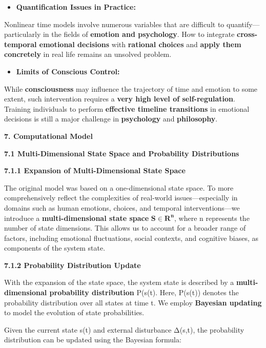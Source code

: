 \documentclass[
]{article}
\begin{document}
\begin{itemize}
\item
  \textbf{Quantification Issues in Practice:}
\end{itemize}

Nonlinear time models involve numerous variables that are difficult to
quantify---particularly in the fields of \textbf{emotion and
psychology}. How to integrate \textbf{cross-temporal emotional
decisions} with \textbf{rational choices} and \textbf{apply them
concretely} in real life remains an unsolved problem.

\begin{itemize}
\item
  \textbf{Limits of Conscious Control:}
\end{itemize}

While \textbf{consciousness} may influence the trajectory of time and
emotion to some extent, such intervention requires a \textbf{very high
level of self-regulation}. Training individuals to perform
\textbf{effective timeline transitions} in emotional decisions is still
a major challenge in \textbf{psychology} and \textbf{philosophy}.

\textbf{7. Computational Model}

\textbf{7.1 Multi-Dimensional State Space and Probability Distributions}

\textbf{7.1.1 Expansion of Multi-Dimensional State Space}

The original model was based on a one-dimensional state space. To more
comprehensively reflect the complexities of real-world
issues---especially in domains such as human emotions, choices, and
temporal interventions---we introduce a \textbf{multi-dimensional state
space} \(\mathbf{S}\mathbf{\in}\mathbf{R}^{\mathbf{n}}\), where n
represents the number of state dimensions. This allows us to account for
a broader range of factors, including emotional fluctuations, social
contexts, and cognitive biases, as components of the system state.

\textbf{7.1.2 Probability Distribution Update}

With the expansion of the state space, the system state is described by
a \textbf{multi-dimensional probability distribution} P(s(t). Here,
P(s(t)) denotes the probability distribution over all states at time t.
We employ \textbf{Bayesian updating} to model the evolution of state
probabilities.

Given the current state s(t) and external disturbance Δ(s,t), the
probability distribution can be updated using the Bayesian formula:
\end{document}
